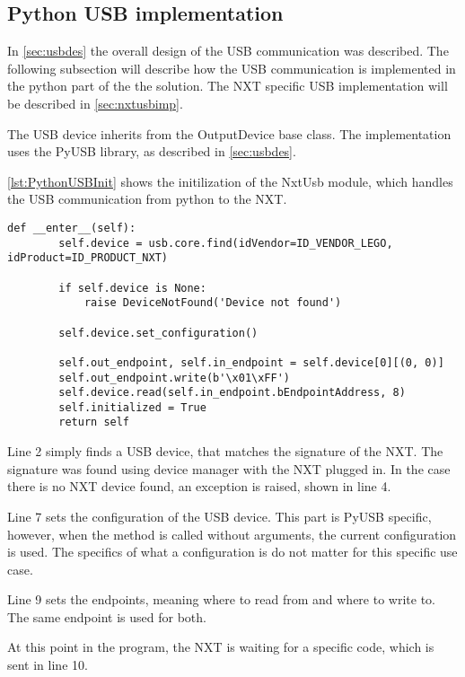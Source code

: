 \subsection{Python USB implementation}\label{sol:subsec:pythonusb}

In \autoref{sec:usbdes} the overall design of the USB communication was described.
The following subsection will describe how the USB communication is implemented in the python part of the the solution.
The NXT specific USB implementation will be described in \autoref{sec:nxtusbimp}.

The USB device inherits from the OutputDevice base class.
The implementation uses the PyUSB library, as described in \autoref{sec:usbdes}\cite{PyUSB}.

\autoref{lst:PythonUSBInit} shows the initilization of the NxtUsb module, which handles the USB communication from python to the NXT.
\begin{lstlisting}[label={lst:PythonUSBInit},caption={The initialization of PyUSB{.} Comments removed}]
    def __enter__(self):
        self.device = usb.core.find(idVendor=ID_VENDOR_LEGO, idProduct=ID_PRODUCT_NXT)

        if self.device is None:
            raise DeviceNotFound('Device not found')

        self.device.set_configuration()

        self.out_endpoint, self.in_endpoint = self.device[0][(0, 0)]
        self.out_endpoint.write(b'\x01\xFF') 
        self.device.read(self.in_endpoint.bEndpointAddress, 8) 
        self.initialized = True
        return self
\end{lstlisting}
Line 2 simply finds a USB device, that matches the signature of the NXT.
The signature was found using device manager with the NXT plugged in.
In the case there is no NXT device found, an exception is raised, shown in line 4.

Line 7 sets the configuration of the USB device.
This part is PyUSB specific, however, when the method is called without arguments, the current configuration is used.
The specifics of what a configuration is do not matter for this specific use case.

Line 9 sets the endpoints, meaning where to read from and where to write to.
The same endpoint is used for both.

At this point in the program, the NXT is waiting for a specific code, which is sent in line 10.

